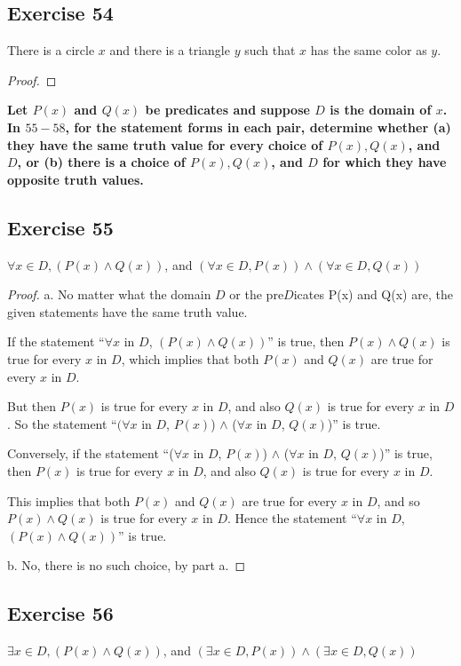 \documentclass[14pt]{extarticle}
\newcommand{\fa}{\forall}
\newcommand{\te}{\exists}
\begin{document}
\subsection{Exercise 54}
There is a circle $x$ and there is a triangle $y$ such that $x$ has the same color as $y$.

\begin{proof}

\end{proof}

{\bf \color{cyan} Let $P(x)$ and $Q(x)$ be predicates and suppose $D$ is the domain of $x$. In $55-58$, for the statement forms in each pair, determine whether (a) they have the same truth value for every choice of $P(x), Q(x)$, and $D$, or (b) there is a choice of $P(x), Q(x)$, and $D$ for which they have opposite truth values.}

\subsection{Exercise 55}
$\fa x \in D, (P(x) \wedge Q(x))$, and $(\fa x \in D, P(x)) \wedge (\fa x \in D, Q(x))$

\begin{proof}
    a. No matter what the domain $D$ or the pre$D$icates P(x) and Q(x) are, the given statements have the same truth value.

    If the statement “$\fa x$ in $D$, $(P(x) \wedge Q(x))$” is true, then $P(x) \wedge Q(x)$ is true for every $x$ in $D$, which implies that both $P(x)$ and $Q(x)$ are true for every $x$ in $D$.

    But then $P(x)$ is true for every $x$ in $D$, and also $Q(x)$ is true for every $x$ in $D$. So the statement “$(\fa x$ in $D$, $P(x)$) $\wedge$ ($\fa x$ in $D$, $Q(x)$)” is true.

    Conversely, if the statement “($\fa x$ in $D$, $P(x)$) $\wedge$ ($\fa x$ in $D$, $Q(x)$)” is true, then $P(x)$ is true for every $x$ in $D$, and also $Q(x)$ is true for every $x$ in $D$.

    This implies that both $P(x)$ and $Q(x)$ are true for every $x$ in $D$, and so $P(x) \wedge Q(x)$ is true for every $x$ in $D$. Hence the statement “$\fa x$ in $D$, $(P(x) \wedge Q(x))$” is true.

    b. No, there is no such choice, by part a.
\end{proof}

\subsection{Exercise 56}
$\te x \in D, (P(x) \wedge Q(x))$, and $(\te x \in D, P(x)) \wedge (\te x \in D, Q(x))$
\end{document}
